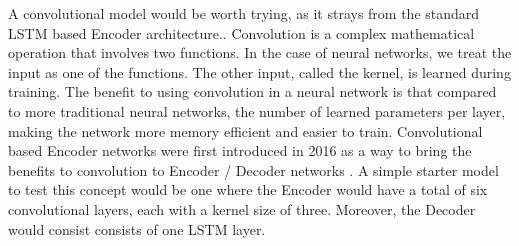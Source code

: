 \documentclass[pageno]{jpaper}
\begin{document}
\par
A convolutional model would be worth trying, as it strays from the standard LSTM based Encoder architecture..  Convolution is a complex mathematical operation that involves two functions.  In the case of neural networks, we treat the input as one of the functions.  The other input, called the kernel, is learned during training.  The benefit to using convolution in a neural network is that compared to more traditional neural networks, the number of learned parameters per layer, making the network more memory efficient and easier to train.  Convolutional based Encoder networks were first introduced in 2016 as a way to bring the benefits to convolution to Encoder / Decoder networks \cite{gehring:2016}.  A simple starter model to test this concept would be one where the Encoder would have a total of six convolutional layers, each with a kernel size of three.  Moreover, the Decoder would consist consists of one LSTM layer.
\end{document}
